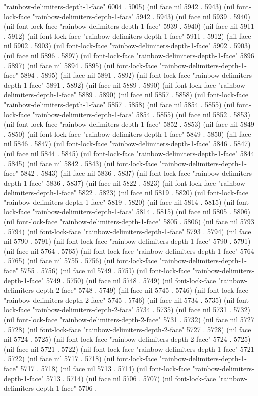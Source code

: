 "rainbow-delimiters-depth-1-face" 6004 . 6005) (nil face nil 5942 . 5943) (nil font-lock-face "rainbow-delimiters-depth-1-face" 5942 . 5943) (nil face nil 5939 . 5940) (nil font-lock-face "rainbow-delimiters-depth-1-face" 5939 . 5940) (nil face nil 5911 . 5912) (nil font-lock-face "rainbow-delimiters-depth-1-face" 5911 . 5912) (nil face nil 5902 . 5903) (nil font-lock-face "rainbow-delimiters-depth-1-face" 5902 . 5903) (nil face nil 5896 . 5897) (nil font-lock-face "rainbow-delimiters-depth-1-face" 5896 . 5897) (nil face nil 5894 . 5895) (nil font-lock-face "rainbow-delimiters-depth-1-face" 5894 . 5895) (nil face nil 5891 . 5892) (nil font-lock-face "rainbow-delimiters-depth-1-face" 5891 . 5892) (nil face nil 5889 . 5890) (nil font-lock-face "rainbow-delimiters-depth-1-face" 5889 . 5890) (nil face nil 5857 . 5858) (nil font-lock-face "rainbow-delimiters-depth-1-face" 5857 . 5858) (nil face nil 5854 . 5855) (nil font-lock-face "rainbow-delimiters-depth-1-face" 5854 . 5855) (nil face nil 5852 . 5853) (nil font-lock-face "rainbow-delimiters-depth-1-face" 5852 . 5853) (nil face nil 5849 . 5850) (nil font-lock-face "rainbow-delimiters-depth-1-face" 5849 . 5850) (nil face nil 5846 . 5847) (nil font-lock-face "rainbow-delimiters-depth-1-face" 5846 . 5847) (nil face nil 5844 . 5845) (nil font-lock-face "rainbow-delimiters-depth-1-face" 5844 . 5845) (nil face nil 5842 . 5843) (nil font-lock-face "rainbow-delimiters-depth-1-face" 5842 . 5843) (nil face nil 5836 . 5837) (nil font-lock-face "rainbow-delimiters-depth-1-face" 5836 . 5837) (nil face nil 5822 . 5823) (nil font-lock-face "rainbow-delimiters-depth-1-face" 5822 . 5823) (nil face nil 5819 . 5820) (nil font-lock-face "rainbow-delimiters-depth-1-face" 5819 . 5820) (nil face nil 5814 . 5815) (nil font-lock-face "rainbow-delimiters-depth-1-face" 5814 . 5815) (nil face nil 5805 . 5806) (nil font-lock-face "rainbow-delimiters-depth-1-face" 5805 . 5806) (nil face nil 5793 . 5794) (nil font-lock-face "rainbow-delimiters-depth-1-face" 5793 . 5794) (nil face nil 5790 . 5791) (nil font-lock-face "rainbow-delimiters-depth-1-face" 5790 . 5791) (nil face nil 5764 . 5765) (nil font-lock-face "rainbow-delimiters-depth-1-face" 5764 . 5765) (nil face nil 5755 . 5756) (nil font-lock-face "rainbow-delimiters-depth-1-face" 5755 . 5756) (nil face nil 5749 . 5750) (nil font-lock-face "rainbow-delimiters-depth-1-face" 5749 . 5750) (nil face nil 5748 . 5749) (nil font-lock-face "rainbow-delimiters-depth-2-face" 5748 . 5749) (nil face nil 5745 . 5746) (nil font-lock-face "rainbow-delimiters-depth-2-face" 5745 . 5746) (nil face nil 5734 . 5735) (nil font-lock-face "rainbow-delimiters-depth-2-face" 5734 . 5735) (nil face nil 5731 . 5732) (nil font-lock-face "rainbow-delimiters-depth-2-face" 5731 . 5732) (nil face nil 5727 . 5728) (nil font-lock-face "rainbow-delimiters-depth-2-face" 5727 . 5728) (nil face nil 5724 . 5725) (nil font-lock-face "rainbow-delimiters-depth-2-face" 5724 . 5725) (nil face nil 5721 . 5722) (nil font-lock-face "rainbow-delimiters-depth-1-face" 5721 . 5722) (nil face nil 5717 . 5718) (nil font-lock-face "rainbow-delimiters-depth-1-face" 5717 . 5718) (nil face nil 5713 . 5714) (nil font-lock-face "rainbow-delimiters-depth-1-face" 5713 . 5714) (nil face nil 5706 . 5707) (nil font-lock-face "rainbow-delimiters-depth-1-face" 5706 . 